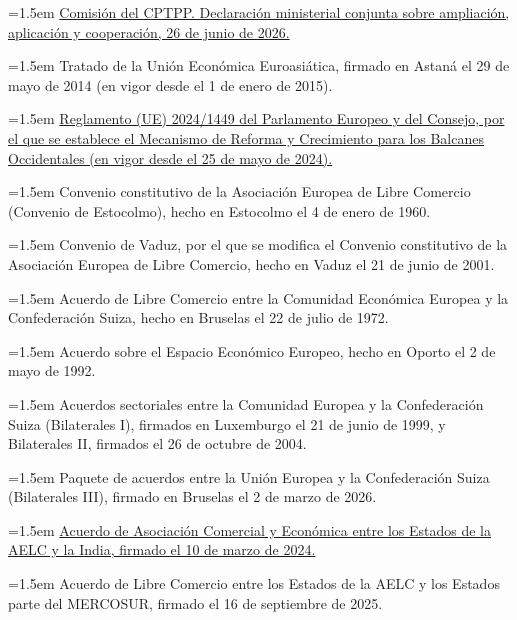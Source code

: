 \documentclass[10pt,a4paper]{article}
\begin{document}
\noindent\hangindent=1.5em \href{https://www.dfat.gov.au/trade/agreements/in-force/cptpp/commission-meetings/comprehensive-and-progressive-agreement-trans-pacific-partnership-cptpp-joint-ministerial-statement-expansion-implementation-and-cooperation-26-june-2026}{Comisión del CPTPP. Declaración ministerial conjunta sobre ampliación, aplicación y cooperación, 26 de junio de 2026.}

\noindent\hangindent=1.5em Tratado de la Unión Económica Euroasiática, firmado en Astaná el 29 de mayo de 2014 (en vigor desde el 1 de enero de 2015).

\noindent\hangindent=1.5em \href{https://enlargement.ec.europa.eu/enlargement-policy/growth-plan-western-balkans_en}{Reglamento (UE) 2024/1449 del Parlamento Europeo y del Consejo, por el que se establece el Mecanismo de Reforma y Crecimiento para los Balcanes Occidentales (en vigor desde el 25 de mayo de 2024).}

\noindent\hangindent=1.5em Convenio constitutivo de la Asociación Europea de Libre Comercio (Convenio de Estocolmo), hecho en Estocolmo el 4 de enero de 1960.

\noindent\hangindent=1.5em Convenio de Vaduz, por el que se modifica el Convenio constitutivo de la Asociación Europea de Libre Comercio, hecho en Vaduz el 21 de junio de 2001.

\noindent\hangindent=1.5em Acuerdo de Libre Comercio entre la Comunidad Económica Europea y la Confederación Suiza, hecho en Bruselas el 22 de julio de 1972.

\noindent\hangindent=1.5em Acuerdo sobre el Espacio Económico Europeo, hecho en Oporto el 2 de mayo de 1992.

\noindent\hangindent=1.5em Acuerdos sectoriales entre la Comunidad Europea y la Confederación Suiza (Bilaterales I), firmados en Luxemburgo el 21 de junio de 1999, y Bilaterales II, firmados el 26 de octubre de 2004.

\noindent\hangindent=1.5em Paquete de acuerdos entre la Unión Europea y la Confederación Suiza (Bilaterales III), firmado en Bruselas el 2 de marzo de 2026.

\noindent\hangindent=1.5em \href{https://www.efta.int/trade-relations/free-trade-network/india}{Acuerdo de Asociación Comercial y Económica entre los Estados de la AELC y la India, firmado el 10 de marzo de 2024.}

\noindent\hangindent=1.5em Acuerdo de Libre Comercio entre los Estados de la AELC y los Estados parte del MERCOSUR, firmado el 16 de septiembre de 2025.
\end{document}
